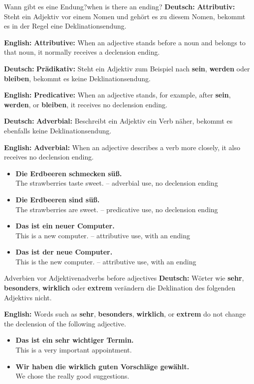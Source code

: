 \documentclass[a4paper,11pt]{article}
\newcommand{\GermanText}[1]{\textbf{Deutsch: }#1\par}
\newcommand{\EnglishText}[1]{{\small\color{SoftGray}\textbf{English: }#1\par}}
\newcommand{\ExampleItem}[2]{\item \textbf{#1}\\{\small\color{SoftGray}#2}}
\begin{document}
\begin{grammarentry}{Wann gibt es eine Endung?}{when is there an ending?}
\GermanText{\textbf{Attributiv:} Steht ein Adjektiv vor einem Nomen und gehört es zu diesem Nomen, bekommt es in der Regel eine Deklinationsendung.}
\EnglishText{\textbf{Attributive:} When an adjective stands before a noun and belongs to that noun, it normally receives a declension ending.}

\GermanText{\textbf{Prädikativ:} Steht ein Adjektiv zum Beispiel nach \textbf{sein}, \textbf{werden} oder \textbf{bleiben}, bekommt es keine Deklinationsendung.}
\EnglishText{\textbf{Predicative:} When an adjective stands, for example, after \textbf{sein}, \textbf{werden}, or \textbf{bleiben}, it receives no declension ending.}

\GermanText{\textbf{Adverbial:} Beschreibt ein Adjektiv ein Verb näher, bekommt es ebenfalls keine Deklinationsendung.}
\EnglishText{\textbf{Adverbial:} When an adjective describes a verb more closely, it also receives no declension ending.}
\end{grammarentry}

\begin{exbox}
\begin{itemize}
\ExampleItem{Die Erdbeeren schmecken süß.}{The strawberries taste sweet. -- adverbial use, no declension ending}
\ExampleItem{Die Erdbeeren sind süß.}{The strawberries are sweet. -- predicative use, no declension ending}
\ExampleItem{Das ist ein neuer Computer.}{This is a new computer. -- attributive use, with an ending}
\ExampleItem{Das ist der neue Computer.}{This is the new computer. -- attributive use, with an ending}
\end{itemize}
\end{exbox}

\begin{grammarentry}{Adverbien vor Adjektiven}{adverbs before adjectives}
\GermanText{Wörter wie \textbf{sehr}, \textbf{besonders}, \textbf{wirklich} oder \textbf{extrem} verändern die Deklination des folgenden Adjektivs nicht.}
\EnglishText{Words such as \textbf{sehr}, \textbf{besonders}, \textbf{wirklich}, or \textbf{extrem} do not change the declension of the following adjective.}
\end{grammarentry}

\begin{exbox}
\begin{itemize}
\ExampleItem{Das ist ein sehr wichtiger Termin.}{This is a very important appointment.}
\ExampleItem{Wir haben die wirklich guten Vorschläge gewählt.}{We chose the really good suggestions.}
\end{itemize}
\end{exbox}
\end{document}
